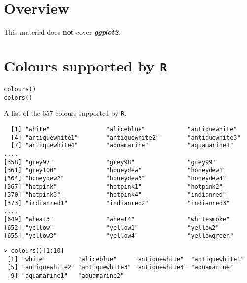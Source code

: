 
\section{Overview}
This material does \textbf{not} cover \textbf{\textit{ggplot2}}.
\section{Colours supported by \texttt{R}}
\begin{framed}
\begin{verbatim}
colours()
colors()
\end{verbatim}
\end{framed}
A list of the 657 colours supported by \texttt{R}.
\begin{verbatim}
  [1] "white"                "aliceblue"            "antiquewhite"        
  [4] "antiquewhite1"        "antiquewhite2"        "antiquewhite3"       
  [7] "antiquewhite4"        "aquamarine"           "aquamarine1"    
....
[358] "grey97"               "grey98"               "grey99"              
[361] "grey100"              "honeydew"             "honeydew1"           
[364] "honeydew2"            "honeydew3"            "honeydew4"           
[367] "hotpink"              "hotpink1"             "hotpink2"            
[370] "hotpink3"             "hotpink4"             "indianred"           
[373] "indianred1"           "indianred2"           "indianred3"                   
....
[649] "wheat3"               "wheat4"               "whitesmoke"          
[652] "yellow"               "yellow1"              "yellow2"             
[655] "yellow3"              "yellow4"              "yellowgreen"     
\end{verbatim}

\begin{verbatim}
> colours()[1:10]
 [1] "white"         "aliceblue"     "antiquewhite"  "antiquewhite1"
 [5] "antiquewhite2" "antiquewhite3" "antiquewhite4" "aquamarine"   
 [9] "aquamarine1"   "aquamarine2"
\end{verbatim}

